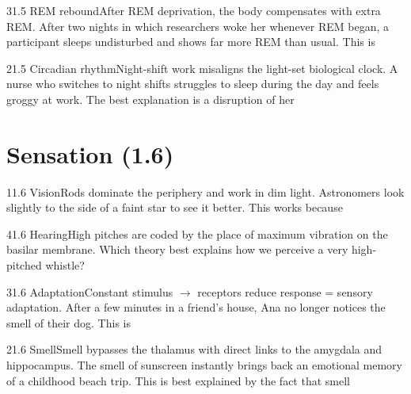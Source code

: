 \documentclass[11pt]{article}
\begin{document}
\begin{q}{3}{1.5 REM rebound}{After REM deprivation, the body compensates with extra REM.}
After two nights in which researchers woke her whenever REM began, a participant sleeps undisturbed and shows far more REM than usual. This is
\end{q}

\begin{q}{2}{1.5 Circadian rhythm}{Night-shift work misaligns the light-set biological clock.}
A nurse who switches to night shifts struggles to sleep during the day and feels groggy at work. The best explanation is a disruption of her
\end{q}

\section{Sensation (1.6)}

\begin{q}{1}{1.6 Vision}{Rods dominate the periphery and work in dim light.}
Astronomers look slightly to the side of a faint star to see it better. This works because
\end{q}

\begin{q}{4}{1.6 Hearing}{High pitches are coded by the place of maximum vibration on the basilar membrane.}
Which theory best explains how we perceive a very high-pitched whistle?
\end{q}

\begin{q}{3}{1.6 Adaptation}{Constant stimulus \(\rightarrow\) receptors reduce response = sensory adaptation.}
After a few minutes in a friend's house, Ana no longer notices the smell of their dog. This is
\end{q}

\begin{q}{2}{1.6 Smell}{Smell bypasses the thalamus with direct links to the amygdala and hippocampus.}
The smell of sunscreen instantly brings back an emotional memory of a childhood beach trip. This is best explained by the fact that smell
\end{q}
\end{document}
